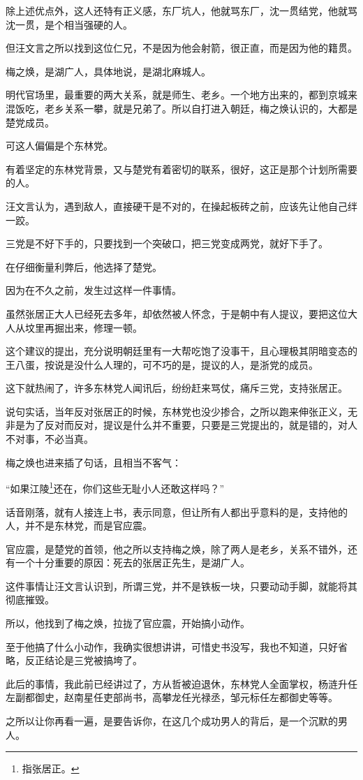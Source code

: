 \begin{multicols}{\theparacolNo}
除上述优点外，这人还特有正义感，东厂坑人，他就骂东厂，沈一贯结党，他就骂沈一贯，是个相当强硬的人。

但汪文言之所以找到这位仁兄，不是因为他会射箭，很正直，而是因为他的籍贯。

梅之焕，是湖广人，具体地说，是湖北麻城人。

明代官场里，最重要的两大关系，就是师生、老乡。一个地方出来的，都到京城来混饭吃，老乡关系一攀，就是兄弟了。所以自打进入朝廷，梅之焕认识的，大都是楚党成员。

可这人偏偏是个东林党。

有着坚定的东林党背景，又与楚党有着密切的联系，很好，这正是那个计划所需要的人。

汪文言认为，遇到敌人，直接硬干是不对的，在操起板砖之前，应该先让他自己绊一跤。

三党是不好下手的，只要找到一个突破口，把三党变成两党，就好下手了。

在仔细衡量利弊后，他选择了楚党。

因为在不久之前，发生过这样一件事情。

虽然张居正大人已经死去多年，却依然被人怀念，于是朝中有人提议，要把这位大人从坟里再掘出来，修理一顿。

这个建议的提出，充分说明朝廷里有一大帮吃饱了没事干，且心理极其阴暗变态的王八蛋，按说是没什么人理的，可不巧的是，提议的人，是浙党的成员。

这下就热闹了，许多东林党人闻讯后，纷纷赶来骂仗，痛斥三党，支持张居正。

说句实话，当年反对张居正的时候，东林党也没少掺合，之所以跑来伸张正义，无非是为了反对而反对，提议是什么并不重要，只要是三党提出的，就是错的，对人不对事，不必当真。

梅之焕也进来插了句话，且相当不客气：

“如果江陵\footnote{指张居正。}还在，你们这些无耻小人还敢这样吗？”

话音刚落，就有人接连上书，表示同意，但让所有人都出乎意料的是，支持他的人，并不是东林党，而是官应震。

官应震，是楚党的首领，他之所以支持梅之焕，除了两人是老乡，关系不错外，还有一个十分重要的原因：死去的张居正先生，是湖广人。

这件事情让汪文言认识到，所谓三党，并不是铁板一块，只要动动手脚，就能将其彻底摧毁。

所以，他找到了梅之焕，拉拢了官应震，开始搞小动作。

至于他搞了什么小动作，我确实很想讲讲，可惜史书没写，我也不知道，只好省略，反正结论是三党被搞垮了。

此后的事情，我此前已经讲过了，方从哲被迫退休，东林党人全面掌权，杨涟升任左副都御史，赵南星任吏部尚书，高攀龙任光禄丞，邹元标任左都御史等等。

之所以让你再看一遍，是要告诉你，在这几个成功男人的背后，是一个沉默的男人。

\ifnum{}
	\end{multicols}
\fi
\newpage
